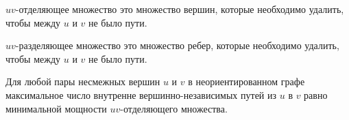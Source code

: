 
\begin{definition}
  \(uv\)-отделяющее множество это множество вершин, которые необходимо удалить,
  чтобы между \(u\) и \(v\) не было пути.
\end{definition}

\begin{definition}
  \(uv\)-разделяющее множество это множество ребер, которые необходимо удалить,
  чтобы между \(u\) и \(v\) не было пути.
\end{definition}

\begin{theorem}
  Для любой пары несмежных вершин \(u\) и \(v\) в неориентированном графе
  максимальное число внутренне вершинно-независимых путей из \(u\) в \(v\) равно
  минимальной мощности \(uv\)-отделяющего множества.
\end{theorem}
